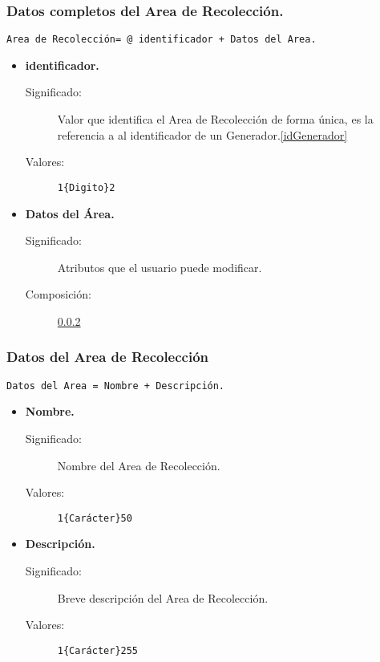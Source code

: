 \subsubsection{Datos completos del Area de Recolección.}
\begin{lstlisting}
Area de Recolección= @ identificador + Datos del Area.
\end{lstlisting}
	\begin{itemize}
		\item \textbf{identificador.}
			\begin{description}
				\item [Significado:] Valor que identifica el Area de Recolección de forma única, es la referencia a al identificador de un Generador.\ref{idGenerador}
				\item [Valores:]{\begin{lstlisting}
1{Digito}2\end{lstlisting}}
			\end{description}
		\item \textbf{Datos del Área.}
			\begin{description}
				\item [Significado:] Atributos que el usuario puede modificar.
				\item [Composición:] \ref{Datos_AreaRecoleccion}
			\end{description}
	\end{itemize}

\subsubsection{Datos del Area de Recolección}\label{Datos_AreaRecoleccion}
\begin{lstlisting}
Datos del Area = Nombre + Descripción.
\end{lstlisting}
	\begin{itemize}
		\item \textbf{Nombre.}
			\begin{description}
				\item [Significado:] Nombre del Area de Recolección.
				\item [Valores:]{\begin{lstlisting}
1{Carácter}50\end{lstlisting}}
			\end{description}
		\item \textbf{Descripción.}
			\begin{description}
				\item [Significado:] Breve descripción del Area de Recolección.
				\item [Valores:]{\begin{lstlisting}
1{Carácter}255\end{lstlisting}}
			\end{description}
	\end{itemize}

